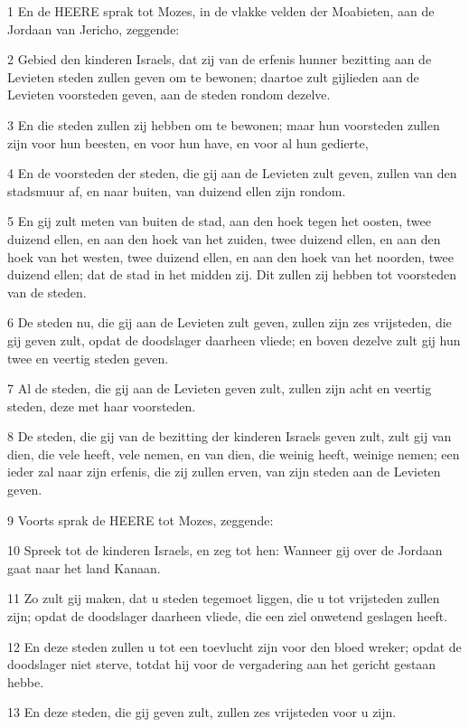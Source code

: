 \par 1 En de HEERE sprak tot Mozes, in de vlakke velden der Moabieten, aan de Jordaan van Jericho, zeggende:
\par 2 Gebied den kinderen Israels, dat zij van de erfenis hunner bezitting aan de Levieten steden zullen geven om te bewonen; daartoe zult gijlieden aan de Levieten voorsteden geven, aan de steden rondom dezelve.
\par 3 En die steden zullen zij hebben om te bewonen; maar hun voorsteden zullen zijn voor hun beesten, en voor hun have, en voor al hun gedierte,
\par 4 En de voorsteden der steden, die gij aan de Levieten zult geven, zullen van den stadsmuur af, en naar buiten, van duizend ellen zijn rondom.
\par 5 En gij zult meten van buiten de stad, aan den hoek tegen het oosten, twee duizend ellen, en aan den hoek van het zuiden, twee duizend ellen, en aan den hoek van het westen, twee duizend ellen, en aan den hoek van het noorden, twee duizend ellen; dat de stad in het midden zij. Dit zullen zij hebben tot voorsteden van de steden.
\par 6 De steden nu, die gij aan de Levieten zult geven, zullen zijn zes vrijsteden, die gij geven zult, opdat de doodslager daarheen vliede; en boven dezelve zult gij hun twee en veertig steden geven.
\par 7 Al de steden, die gij aan de Levieten geven zult, zullen zijn acht en veertig steden, deze met haar voorsteden.
\par 8 De steden, die gij van de bezitting der kinderen Israels geven zult, zult gij van dien, die vele heeft, vele nemen, en van dien, die weinig heeft, weinige nemen; een ieder zal naar zijn erfenis, die zij zullen erven, van zijn steden aan de Levieten geven.
\par 9 Voorts sprak de HEERE tot Mozes, zeggende:
\par 10 Spreek tot de kinderen Israels, en zeg tot hen: Wanneer gij over de Jordaan gaat naar het land Kanaan.
\par 11 Zo zult gij maken, dat u steden tegemoet liggen, die u tot vrijsteden zullen zijn; opdat de doodslager daarheen vliede, die een ziel onwetend geslagen heeft.
\par 12 En deze steden zullen u tot een toevlucht zijn voor den bloed wreker; opdat de doodslager niet sterve, totdat hij voor de vergadering aan het gericht gestaan hebbe.
\par 13 En deze steden, die gij geven zult, zullen zes vrijsteden voor u zijn.
